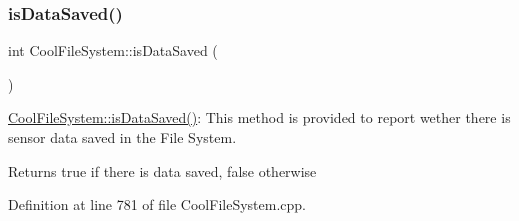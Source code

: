 \subsubsection{\texorpdfstring{is\+Data\+Saved()}{isDataSaved()}}
{\footnotesize\ttfamily int Cool\+File\+System\+::is\+Data\+Saved (\begin{DoxyParamCaption}{ }\end{DoxyParamCaption})}

\hyperlink{class_cool_file_system_ac86a40e7c3a1842f7342f698d34324f9}{Cool\+File\+System\+::is\+Data\+Saved()}\+: This method is provided to report wether there is sensor data saved in the File System.

\begin{DoxyReturn}{Returns}
true if there is data saved, false otherwise 
\end{DoxyReturn}


Definition at line 781 of file Cool\+File\+System.\+cpp.


